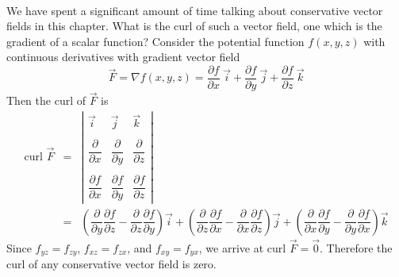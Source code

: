 \\

We have spent a significant amount of time talking about conservative vector fields in this chapter.  What is the curl of such a vector field, one which is the gradient of a scalar function?  Consider the potential function $f(x,y,z)$ with continuous derivatives with gradient vector field $$\vec F = \nabla f(x,y,z) = \dfrac{\partial f}{\partial x} \: \vec i + \dfrac{\partial f}{\partial y} \: \vec j + \dfrac{\partial f}{\partial z} \: \vec k$$
Then the curl of $\vec F$ is
\begin{eqnarray*}
\text{curl } \vec F & = & \left| \begin{array}{ccc} \vec i & \vec j & \vec k \\ & & \\ \dfrac{\partial}{\partial x} & \dfrac{\partial}{\partial y} & \dfrac{\partial}{\partial z} \\ &  & \\ \dfrac{\partial f}{\partial x} & \dfrac{\partial f}{\partial y} & \dfrac{\partial f}{\partial z} \end{array} \right| \\
& = & \left( \dfrac{\partial}{\partial y} \dfrac{\partial f}{\partial z} - \dfrac{\partial}{\partial z} \dfrac{\partial f}{\partial y} \right) \vec i + \left( \dfrac{\partial}{\partial z} \dfrac{\partial f}{\partial x} - \dfrac{\partial}{\partial x} \dfrac{\partial f}{\partial z} \right)  \vec j + \left( \dfrac{\partial}{\partial x} \dfrac{\partial f}{\partial y} - \dfrac{\partial}{\partial y} \dfrac{\partial f}{\partial x} \right) \vec k
\end{eqnarray*}
Since $f_{yz} = f_{zy}$, $f_{xz} = f_{zx}$, and $f_{xy} = f_{yx}$, we arrive at $\text{curl } \vec F = \vec 0$.  Therefore the curl of any conservative vector field is zero.\\

